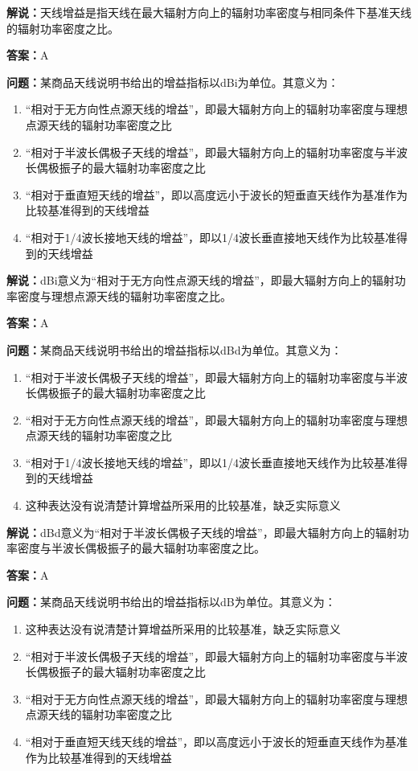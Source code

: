 \documentclass[UTF8]{ctexbook}
\begin{document}
\textbf{解说：}天线增益是指天线在最大辐射方向上的辐射功率密度与相同条件下基准天线的辐射功率密度之比。%

\textbf{答案：}A

\textbf{问题：}某商品天线说明书给出的增益指标以dBi为单位。其意义为：
\begin{enumerate}[label=\Alph*), leftmargin=3em]
  \item “相对于无方向性点源天线的增益”，即最大辐射方向上的辐射功率密度与理想点源天线的辐射功率密度之比
  \item “相对于半波长偶极子天线的增益”，即最大辐射方向上的辐射功率密度与半波长偶极振子的最大辐射功率密度之比
  \item “相对于垂直短天线的增益”，即以高度远小于波长的短垂直天线作为基准作为比较基准得到的天线增益
  \item “相对于1/4波长接地天线的增益”，即以1/4波长垂直接地天线作为比较基准得到的天线增益
\end{enumerate}

\textbf{解说：}dBi意义为“相对于无方向性点源天线的增益”，即最大辐射方向上的辐射功率密度与理想点源天线的辐射功率密度之比。%

\textbf{答案：}A

\textbf{问题：}某商品天线说明书给出的增益指标以dBd为单位。其意义为：

\begin{enumerate}[label=\Alph*), leftmargin=3em]
  \item “相对于半波长偶极子天线的增益”，即最大辐射方向上的辐射功率密度与半波长偶极振子的最大辐射功率密度之比
  \item “相对于无方向性点源天线的增益”，即最大辐射方向上的辐射功率密度与理想点源天线的辐射功率密度之比
  \item “相对于1/4波长接地天线的增益”，即以1/4波长垂直接地天线作为比较基准得到的天线增益
  \item 这种表达没有说清楚计算增益所采用的比较基准，缺乏实际意义
\end{enumerate}

\textbf{解说：}dBd意义为“相对于半波长偶极子天线的增益”，即最大辐射方向上的辐射功率密度与半波长偶极振子的最大辐射功率密度之比。%

\textbf{答案：}A

\textbf{问题：}某商品天线说明书给出的增益指标以dB为单位。其意义为：

\begin{enumerate}[label=\Alph*), leftmargin=3em]
  \item 这种表达没有说清楚计算增益所采用的比较基准，缺乏实际意义
  \item “相对于半波长偶极子天线的增益”，即最大辐射方向上的辐射功率密度与半波长偶极振子的最大辐射功率密度之比
  \item “相对于无方向性点源天线的增益”，即最大辐射方向上的辐射功率密度与理想点源天线的辐射功率密度之比
  \item “相对于垂直短天线天线的增益”，即以高度远小于波长的短垂直天线作为基准作为比较基准得到的天线增益
\end{enumerate}
\end{document}
